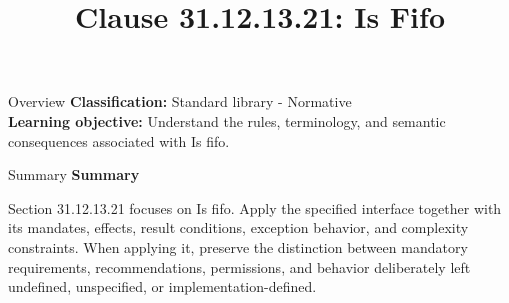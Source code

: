 \documentclass[10pt,letterpaper]{article}
\title{Clause 31.12.13.21: Is Fifo}
\author{}
\date{}
\begin{document}
\maketitle
\begin{CornellOverviewBox}{Overview}
\textbf{Classification:} Standard library - Normative\\[2pt]
\textbf{Learning objective:} Understand the rules, terminology, and semantic consequences associated with Is fifo.
\end{CornellOverviewBox}\begin{CornellSummaryBox}{Summary}
{\sffamily\bfseries\color{Accent} Summary}\par\vspace{3pt}Section 31.12.13.21 focuses on Is fifo. Apply the specified interface together with its mandates, effects, result conditions, exception behavior, and complexity constraints. When applying it, preserve the distinction between mandatory requirements, recommendations, permissions, and behavior deliberately left undefined, unspecified, or implementation-defined.
\end{CornellSummaryBox}
\end{document}
